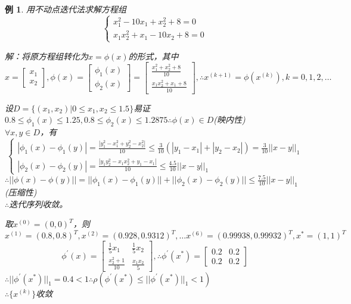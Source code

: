 \documentclass[a4paper]{article}
\newtheorem{example}{例}[section]
\begin{document}
\begin{example}
    用不动点迭代法求解方程组
    $$\left\{\begin{array}{lr}
        x_1^2-10x_1+x_2^2+8=0\\
        x_1x_2^2+x_1-10x_2+8=0
    \end{array}\right.$$
    
    解：将原方程组转化为$x=\phi(x)$的形式，其中$x=\left[\begin{matrix}
        x_1\\x_2
    \end{matrix}\right], \phi(x)=\left[\begin{matrix}
        \phi_1(x)\\ \phi_2(x)
    \end{matrix}\right]=\left[\begin{matrix}
        \frac{x_1^2+x_2^2+8}{10} \\ \frac{x_1x_2^2+x_1+8}{10}
    \end{matrix}\right], \therefore x^{(k+1)}=\phi(x^{(k)}), k=0,1,2,\dots $

    设$D=\{(x_1,x_2)|0\le x_1, x_2\le 1.5 \}$易证$0.8\le \phi_1(x)\le 1.25, 0.8\le \phi_2(x)\le 1.2875 \therefore \phi(x)\in D $(映内性)\\
    $\forall x, y \in D$，有
    \begin{equation*}
        \left\{
            \begin{array}{lr}
                |\phi_1(x)-\phi_1(y)|=\frac{|y_1^2-x_1^2+y_2^2-x_2^2|}{10}\le \frac{3}{10}(|y_1-x_1|+|y_2-x_2|)=\frac{3}{10}||x-y||_1 \\
                |\phi_2(x)-\phi_2(y)|=\frac{|y_1y_2^2-x_1x_2^2+y_1-x_1|}{10}\le \frac{4.5}{10}||x-y||_1
            \end{array}
            \right.
    \end{equation*}
    $\therefore ||\phi(x)-\phi(y)||=||\phi_1(x)-\phi_1(y)||+||\phi_2(x)-\phi_2(y)||\le \frac{7.5}{10}||x-y||_1$(压缩性)\\
    $\therefore$迭代序列收敛。

    取$x^{(0)}=(0,0)^T $，则$x^{(1)}=(0.8, 0.8)^T, x^{(2)}=(0.928, 0.9312)^T, \dots x^{(6)}=(0.99938, 0.99932)^T, x^*=(1,1)^T$
    $$\phi^{'}(x)= \left[\begin{matrix}
        \frac{1}{5}x_1 & \frac{1}{5} x_2 \\
        \frac{x_2^2+1}{10} & \frac{x_1x_2}{5}
    \end{matrix}\right], \therefore \phi^{'}(x^*)=\left[\begin{matrix}
        0.2 & 0.2 \\
        0.2 & 0.2
    \end{matrix}\right] $$
    $\therefore ||\phi^{'}(x^*) ||_1=0.4<1 \therefore \rho(\phi^{'}(x^*)\le ||\phi^{'}(x^*)||_1<1 )$\\
    $\therefore \{x^{(k)} \}$收敛
\end{example}
\end{document}
